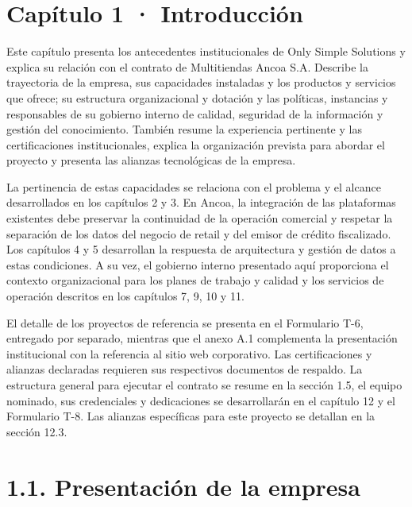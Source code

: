 \documentclass[11pt]{article}
\begin{document}
\renewcommand{\tablename}{Tabla}

\hypersetup{pageanchor=false}
\hypersetup{pageanchor=true}
\tableofcontents
\clearpage
\renewcommand{\listfigurename}{Lista de figuras}
\listoffigures
\clearpage
\renewcommand{\listtablename}{Lista de tablas}
\listoftables
\clearpage

\section{Capítulo 1 · Introducción}\label{capuxedtulo-1-introducciuxf3n}

Este capítulo presenta los antecedentes institucionales de Only Simple Solutions y explica su relación con el contrato de Multitiendas Ancoa S.A. Describe la trayectoria de la empresa, sus capacidades instaladas y los productos y servicios que ofrece; su estructura organizacional y dotación y las políticas, instancias y responsables de su gobierno interno de calidad, seguridad de la información y gestión del conocimiento. También resume la experiencia pertinente y las certificaciones institucionales, explica la organización prevista para abordar el proyecto y presenta las alianzas tecnológicas de la empresa.

La pertinencia de estas capacidades se relaciona con el problema y el alcance desarrollados en los capítulos 2 y 3. En Ancoa, la integración de las plataformas existentes debe preservar la continuidad de la operación comercial y respetar la separación de los datos del negocio de retail y del emisor de crédito fiscalizado. Los capítulos 4 y 5 desarrollan la respuesta de arquitectura y gestión de datos a estas condiciones. A su vez, el gobierno interno presentado aquí proporciona el contexto organizacional para los planes de trabajo y calidad y los servicios de operación descritos en los capítulos 7, 9, 10 y 11.

El detalle de los proyectos de referencia se presenta en el Formulario T-6, entregado por separado, mientras que el anexo A.1 complementa la presentación institucional con la referencia al sitio web corporativo. Las certificaciones y alianzas declaradas requieren sus respectivos documentos de respaldo. La estructura general para ejecutar el contrato se resume en la sección 1.5, el equipo nominado, sus credenciales y dedicaciones se desarrollarán en el capítulo 12 y el Formulario T-8. Las alianzas específicas para este proyecto se detallan en la sección 12.3.

\section{1.1. Presentación de la empresa}\label{presentaciuxf3n-de-la-empresa}
\end{document}
